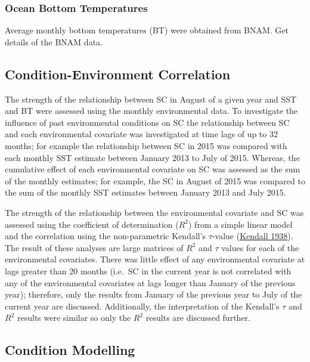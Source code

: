 \documentclass[
]{article}
\begin{document}
\hypertarget{ocean-bottom-temperatures}{%
\subsubsection{Ocean Bottom Temperatures}\label{ocean-bottom-temperatures}}

Average monthly bottom temperatures (BT) were obtained from BNAM. Get details of the BNAM data.

\hypertarget{condition-environment-correlation}{%
\subsection{Condition-Environment Correlation}\label{condition-environment-correlation}}

The strength of the relationship between SC in August of a given year and SST and BT were assessed using the monthly environmental data. To investigate the influence of past environmental conditions on SC the relationship between SC and each environmental covariate was investigated at time lags of up to 32 months; for example the relationship between SC in 2015 was compared with each monthly SST estimate between January 2013 to July of 2015. Whereas, the cumulative effect of each environmental covariate on SC was assessed as the sum of the monthly estimates; for example, the SC in August of 2015 was compared to the sum of the monthly SST estimates between January 2013 and July 2015.

The strength of the relationship between the environmental covariate and SC was assessed using the coefficient of determination (\(R^2\)) from a simple linear model and the correlation using the non-parametric Kendall's \(\tau\)-value (\protect\hyperlink{ref-kendallNewMeasureRank1938}{Kendall 1938}). The result of these analyses are large matrices of \(R^2\) and \(\tau\) values for each of the environmental covariates. There was little effect of any environmental covariate at lags greater than 20 months (i.e.~SC in the current year is not correlated with any of the environmental covariates at lags longer than January of the previous year); therefore, only the results from January of the previous year to July of the current year are discussed. Additionally, the interpretation of the Kendall's \(\tau\) and \(R^2\) results were similar so only the \(R^2\) results are discussed further.

\hypertarget{condition-modelling}{%
\subsection{Condition Modelling}\label{condition-modelling}}
\end{document}
